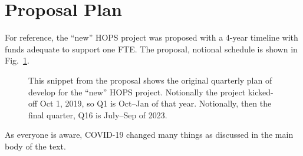 %
%
\section{Proposal Plan}
\label{sec:prop-plan}

For reference, the ``new'' HOPS project was proposed with
a 4-year timeline with funds adequate to support one FTE.
The proposal, notional schedule is shown in
Fig.~\ref{fig:prop-quarterly}.

\begin{figure}[!h]
\caption[Proposed Quarterly Plan]{%
This snippet from the proposal shows the original quarterly
plan of develop for the ``new'' HOPS project.  Notionally the
project kicked-off Oct 1, 2019, so Q1 is Oct--Jan of that
year.  Notionally, then the final quarter, Q16 is July--Sep
of 2023.  }
\label{fig:prop-quarterly}
\end{figure}

As everyone is aware, COVID-19 changed many things as discussed
in the main body of the text.

%
%
%
